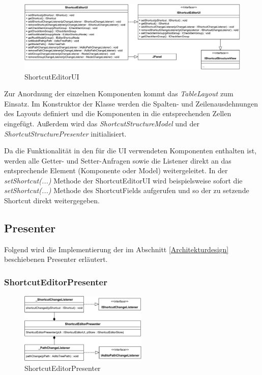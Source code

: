 \begin{figure}[H]
	\centering
	\includegraphics[width=1\linewidth]{../graphic/diagrams/CD_ShortcutEditorUI/ShortcutEditorUI}
	\caption{ShortcutEditorUI}
	\label{fig:shortcuteditorui}
\end{figure} 

\vspace{-12px}

Zur Anordnung der einzelnen Komponenten kommt das \emph{TableLayout} zum Einsatz. Im Konstruktor der Klasse werden die Spalten- und Zeilenausdehnungen des Layouts definiert und die Komponenten in die entsprechenden Zellen eingefügt. Außerdem wird das \emph{ShortcutStructureModel} und der \emph{ShortcutStructurePresenter} initialisiert. 

Da die Funktionalität in den für die UI verwendeten Komponenten enthalten ist, werden alle Getter- und Setter-Anfragen sowie die Listener direkt an das entsprechende Element (Komponente oder Model) weitergeleitet. In der \emph{setShortcut(...)} Methode der ShortcutEditorUI wird beispielsweise sofort die \emph{setShortcut(...)} Methode des ShortcutFields aufgerufen und so der zu setzende Shortcut direkt weitergegeben.

\newpage

\subsection{Presenter}

Folgend wird die Implementierung der im Abschnitt \ref{Architekturdesign} beschiebenen Presenter erläutert.

\subsubsection{ShortcutEditorPresenter}

\begin{figure}
	\vspace{-12px}
	\centering
	\includegraphics[width=230px]{../graphic/diagrams/CD_ShortcutEditorPresenter/ShortcutEditorPresenter}
	\caption{ShortcutEditorPresenter}
	\label{fig:shortcuteditorpresenter}
\end{figure}

